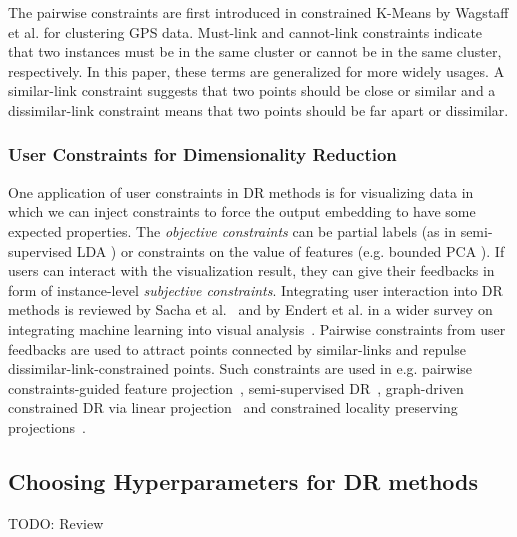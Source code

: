 The pairwise constraints are first introduced in constrained K-Means by Wagstaff et al. \cite{wagstaff2001constrained} for clustering GPS data. Must-link and cannot-link constraints indicate that two instances must be in the same cluster or cannot be in the same cluster, respectively.
In this paper, these terms are generalized for more widely usages. A similar-link constraint suggests that two points should be close or similar and a dissimilar-link constraint means that two points should be far apart or dissimilar.

\subsubsection{User Constraints for Dimensionality Reduction}\label{subsec:constraints_dr}
One application of user constraints in DR methods is for visualizing data in which we can inject constraints to force the output embedding to have some expected properties.
The \emph{objective constraints} can be partial labels (as in semi-supervised LDA \cite{Sugiyama2008SELF}) or constraints on the value of features (e.g. bounded PCA \cite{giordani2007bpca}). 
If users can interact with the visualization result, they can give their feedbacks in form of instance-level \emph{subjective constraints}.
Integrating user interaction into DR methods is reviewed by Sacha et al.~\cite{Sacha2017Interaction} and by Endert et al. in a wider survey on integrating machine learning into visual analysis~\cite{Endert2017SOTA}.
Pairwise constraints from user feedbacks are used to attract points connected by similar-links and repulse dissimilar-link-constrained points. Such constraints are used in e.g. pairwise constraints-guided feature projection~\cite{tang2007pairwise}, semi-supervised DR~\cite{zhang2007ssdr}, graph-driven constrained DR via linear projection~\cite{davidson2009gcdr} and constrained locality preserving projections~\cite{cevikalp2008CLPP}.


\subsection{Choosing Hyperparameters for DR methods}

TODO: Review


